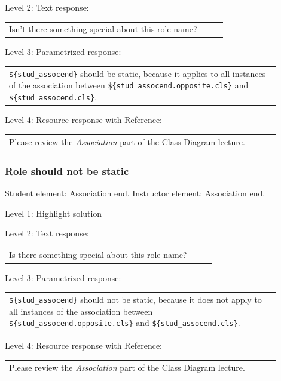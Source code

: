 \noindent Level 2: Text response: \medskip

\begin{tabular}{|p{0.9\linewidth}}
Isn't there something special about this role name?
\end{tabular} \medskip

\noindent Level 3: Parametrized response: \medskip

\begin{tabular}{|p{0.9\linewidth}}
\verb|${stud_assocend}| should be static, because it applies to all instances of the association between \verb|${stud_assocend.opposite.cls}| and \verb|${stud_assocend.cls}|.
\end{tabular} \medskip

\noindent Level 4: Resource response with Reference: \medskip

\begin{tabular}{|p{0.9\linewidth}}
Please review the \textit{Association} part of the Class Diagram lecture.
\end{tabular} \medskip


\subsubsection{Role should not be static}

Student element: Association end. Instructor element: Association end. \medskip

\noindent Level 1: Highlight solution  \medskip

\noindent Level 2: Text response: \medskip

\begin{tabular}{|p{0.9\linewidth}}
Is there something special about this role name?
\end{tabular} \medskip

\noindent Level 3: Parametrized response: \medskip

\begin{tabular}{|p{0.9\linewidth}}
\verb|${stud_assocend}| should not be static, because it does not apply to all instances of the association between \verb|${stud_assocend.opposite.cls}| and \verb|${stud_assocend.cls}|.
\end{tabular} \medskip

\noindent Level 4: Resource response with Reference: \medskip

\begin{tabular}{|p{0.9\linewidth}}
Please review the \textit{Association} part of the Class Diagram lecture.
\end{tabular} \medskip


